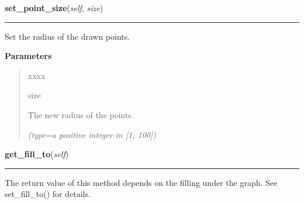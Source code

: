     \label{pygtk_chart:line_chart:Graph:set_point_size}

    \vspace{0.5ex}

\hspace{.8\funcindent}\begin{boxedminipage}{\funcwidth}

    \raggedright \textbf{set\_point\_size}(\textit{self}, \textit{size})

    \vspace{-1.5ex}

    \rule{\textwidth}{0.5\fboxrule}
\setlength{\parskip}{2ex}
    Set the radius of the drawn points.

\setlength{\parskip}{1ex}
      \textbf{Parameters}
      \vspace{-1ex}

      \begin{quote}
        \begin{Ventry}{xxxx}

          \item[size]

          The new radius of the points.

            {\it (type=a positive integer in [1, 100])}

        \end{Ventry}

      \end{quote}

    \end{boxedminipage}

    \label{pygtk_chart:line_chart:Graph:get_fill_to}

    \vspace{0.5ex}

\hspace{.8\funcindent}\begin{boxedminipage}{\funcwidth}

    \raggedright \textbf{get\_fill\_to}(\textit{self})

    \vspace{-1.5ex}

    \rule{\textwidth}{0.5\fboxrule}
\setlength{\parskip}{2ex}
    The return value of this method depends on the filling under the graph.
    See set\_fill\_to() for details.

\setlength{\parskip}{1ex}
    \end{boxedminipage}

